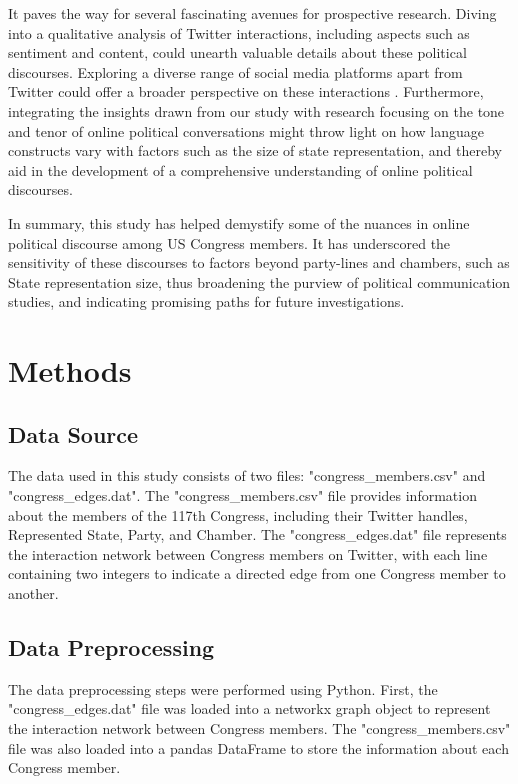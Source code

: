 \documentclass[11pt]{article}
\begin{document}
It paves the way for several fascinating avenues for prospective research. Diving into a qualitative analysis of Twitter interactions, including aspects such as sentiment and content, could unearth valuable details about these political discourses. Exploring a diverse range of social media platforms apart from Twitter could offer a broader perspective on these interactions \cite{Borge-Holthoefer2014ContentAN}. Furthermore, integrating the insights drawn from our study with research focusing on the tone and tenor of online political conversations \cite{Rathje2021OutgroupAD} might throw light on how language constructs vary with factors such as the size of state representation, and thereby aid in the development of a comprehensive understanding of online political discourses.

In summary, this study has helped demystify some of the nuances in online political discourse among US Congress members. It has underscored the sensitivity of these discourses to factors beyond party-lines and chambers, such as State representation size, thus broadening the purview of political communication studies, and indicating promising paths for future investigations.

\section*{Methods}

\subsection*{Data Source}
The data used in this study consists of two files: "congress\_members.csv" and "congress\_edges.dat". The "congress\_members.csv" file provides information about the members of the 117th Congress, including their Twitter handles, Represented State, Party, and Chamber. The "congress\_edges.dat" file represents the interaction network between Congress members on Twitter, with each line containing two integers to indicate a directed edge from one Congress member to another.

\subsection*{Data Preprocessing}
The data preprocessing steps were performed using Python. First, the "congress\_edges.dat" file was loaded into a networkx graph object to represent the interaction network between Congress members. The "congress\_members.csv" file was also loaded into a pandas DataFrame to store the information about each Congress member.
\end{document}
